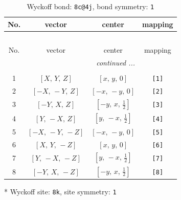 \documentclass[fleqn,8pt]{jsarticle}
\begin{document}
\renewcommand{\arraystretch}{1.2}
\begin{longtable}{cccc}
\caption{Wyckoff bond: {\tt 8c@4j}, bond symmetry: {\tt 1}}
 \\
 \hline \hline
No. & vector & center & mapping \\ \hline \endfirsthead

\multicolumn{3}{l}{\tablename\ \thetable{}} \\
 \hline \hline
No. & vector & center & mapping \\ \hline \endhead

 \hline \hline
\multicolumn{3}{r}{\footnotesize\it continued ...} \\ \endfoot

 \hline \hline
\multicolumn{3}{r}{} \\ \endlastfoot

1 & $\left[ X,\, Y,\, Z \right]$ & $\left[ x,\, y,\, 0 \right]$ & {\tt [1]} \\ \hline
2 & $\left[ - X,\, - Y,\, Z \right]$ & $\left[ - x,\, - y,\, 0 \right]$ & {\tt [2]} \\ \hline
3 & $\left[ - Y,\, X,\, Z \right]$ & $\left[ - y,\, x,\, \frac{1}{2} \right]$ & {\tt [3]} \\ \hline
4 & $\left[ Y,\, - X,\, Z \right]$ & $\left[ y,\, - x,\, \frac{1}{2} \right]$ & {\tt [4]} \\ \hline
5 & $\left[ - X,\, - Y,\, - Z \right]$ & $\left[ - x,\, - y,\, 0 \right]$ & {\tt [5]} \\ \hline
6 & $\left[ X,\, Y,\, - Z \right]$ & $\left[ x,\, y,\, 0 \right]$ & {\tt [6]} \\ \hline
7 & $\left[ Y,\, - X,\, - Z \right]$ & $\left[ y,\, - x,\, \frac{1}{2} \right]$ & {\tt [7]} \\ \hline
8 & $\left[ - Y,\, X,\, - Z \right]$ & $\left[ - y,\, x,\, \frac{1}{2} \right]$ & {\tt [8]} \\
\end{longtable}
* Wyckoff site: {\tt 8k}, site symmetry: {\tt 1}
\renewcommand{\arraystretch}{1.2}
\end{document}
